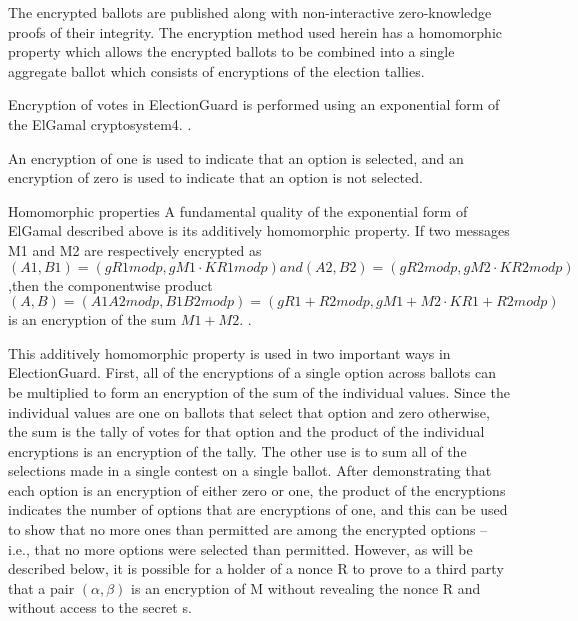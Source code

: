 The encrypted ballots are published along with non-interactive zero-knowledge proofs of their integrity. The encryption
method used herein has a homomorphic property which allows the encrypted ballots to be combined into a single aggregate
ballot which consists of encryptions of the election tallies.
\cite[3]{eg-spec}

Encryption of votes in ElectionGuard is performed using an exponential form of the ElGamal cryptosystem4.
\cite[4]{eg-spec}.

An encryption of one is used to indicate that an option is selected, and an encryption of zero is used to indicate that
an option is not selected.\cite[5]{eg-spec}

Homomorphic properties A fundamental quality of the exponential form of ElGamal described above is its additively
homomorphic property. If two messages M1 and M2 are respectively encrypted as $(A1, B1) = (gR1 mod p, gM1 \cdot KR1 mod p)
    and (A2, B2) = (gR2 mod p, gM2 \cdot KR2 mod p)$ ,then the componentwise product $(A, B) = (A1A2 mod p, B1B2 mod p) = (gR1+R2
    mod p, gM1+M2 \cdot KR1+R2 mod p)$ is an encryption of the sum $M1 + M2$.
\cite[5]{eg-spec}.

This additively homomorphic property is used in two important ways in ElectionGuard. First, all of the encryptions of a
single option across ballots can be multiplied to form an encryption of the sum of the individual values. Since the
individual values are one on ballots that select that option and zero otherwise, the sum is the tally of votes for that
option and the product of the individual encryptions is an encryption of the tally. The other use is to sum all of the
selections made in a single contest on a single ballot. After demonstrating that each option is an encryption of either
zero or one, the product of the encryptions indicates the number of options that are encryptions of one, and this can be
used to show that no more ones than permitted are among the encrypted options – i.e., that no more options were selected
than permitted. However, as will be described below, it is possible for a holder of a nonce R to prove to a third party
that a pair $(\alpha, \beta)$ is an encryption of M without revealing the nonce R and without access to the secret s.
\cite[5]{eg-spec}


